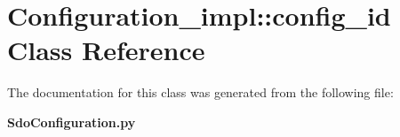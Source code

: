 \section{Configuration\_\-impl::config\_\-id Class Reference}
\label{classConfiguration__impl_1_1config__id}


The documentation for this class was generated from the following file:\begin{CompactItemize}
\item 
{\bf Sdo\-Configuration.py}\end{CompactItemize}

